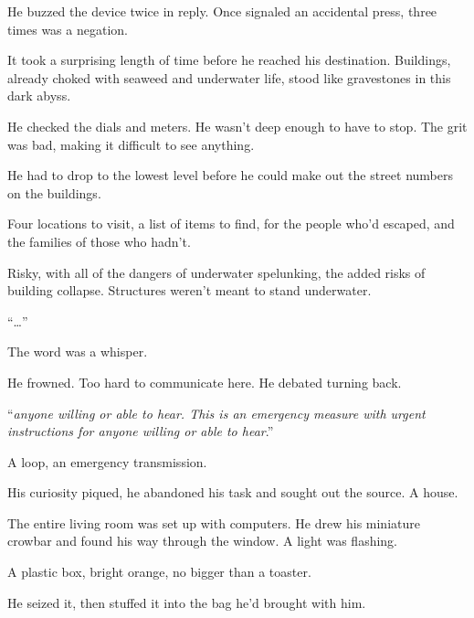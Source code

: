 He buzzed the device twice in reply.  Once signaled an accidental press, three times was a negation.



It took a surprising length of time before he reached his destination.  Buildings, already choked with seaweed and underwater life, stood like gravestones in this dark abyss.



He checked the dials and meters.  He wasn't deep enough to have to stop.  The grit was bad, making it difficult to see anything.



He had to drop to the lowest level before he could make out the street numbers on the buildings.



Four locations to visit, a list of items to find, for the people who'd escaped, and the families of those who hadn't.



Risky, with all of the dangers of underwater spelunking, the added risks of building collapse.  Structures weren't meant to stand underwater.



``\emph{\ldotsurgent}\ldots''



The word was a whisper.



He frowned.  Too hard to communicate here.  He debated turning back.



``\emph{\ldotsfor anyone willing or able to hear.  This is an emergency measure with urgent instructions for anyone willing or able to hear}.''



A loop, an emergency transmission.



His curiosity piqued, he abandoned his task and sought out the source.  A house.



The entire living room was set up with computers.  He drew his miniature crowbar and found his way through the window.  A light was flashing.



A plastic box, bright orange, no bigger than a toaster.



He seized it, then stuffed it into the bag he'd brought with him.



